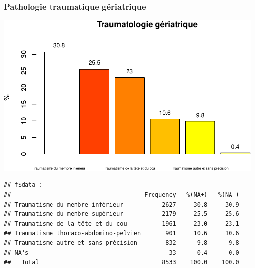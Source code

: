 \documentclass[]{article}
\newenvironment{Shaded}{\begin{snugshade}}{\end{snugshade}}
\newcommand{\KeywordTok}[1]{\textcolor[rgb]{0.13,0.29,0.53}{\textbf{{#1}}}}
\newcommand{\DataTypeTok}[1]{\textcolor[rgb]{0.13,0.29,0.53}{{#1}}}
\newcommand{\FloatTok}[1]{\textcolor[rgb]{0.00,0.00,0.81}{{#1}}}
\newcommand{\StringTok}[1]{\textcolor[rgb]{0.31,0.60,0.02}{{#1}}}
\newcommand{\NormalTok}[1]{{#1}}
\begin{document}
\subsubsection{Pathologie traumatique
gériatrique}\label{pathologie-traumatique-geriatrique}

\begin{Shaded}
\end{Shaded}

\includegraphics{analyse_merge_files/figure-latex/chap_ger_trau-1.pdf}

\begin{verbatim}
## f$data : 
##                                      Frequency   %(NA+)   %(NA-)
## Traumatisme du membre inférieur           2627     30.8     30.9
## Traumatisme du membre supérieur           2179     25.5     25.6
## Traumatisme de la tête et du cou          1961     23.0     23.1
## Traumatisme thoraco-abdomino-pelvien       901     10.6     10.6
## Traumatisme autre et sans précision        832      9.8      9.8
## NA's                                        33      0.4      0.0
##   Total                                   8533    100.0    100.0
\end{verbatim}
\end{document}
